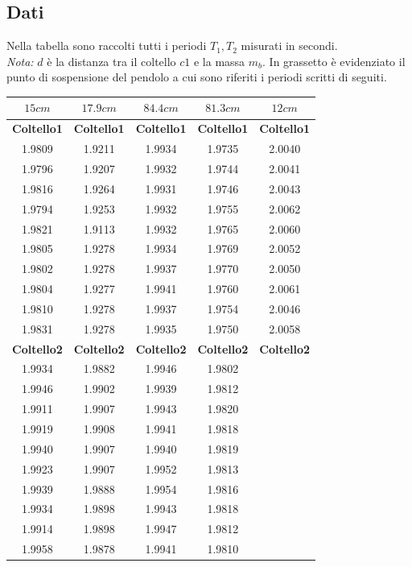 \subsection{Dati}
Nella tabella sono raccolti tutti i periodi $T_1,T_2$ misurati in secondi. \\
\textit{Nota:} $d$ è la distanza tra il coltello $c1$ e la massa $m_b$. 
In grassetto è evidenziato il punto di sospensione del pendolo a cui sono riferiti i periodi scritti di seguiti. 
\begin{center}
\begin{tabular}{*{5}{c}}

\textbf{$15cm$} & \textbf{$17.9cm$} & \textbf{$84.4cm$}& \textbf{$81.3cm$}& \textbf{$12cm$}\\
\midrule
 \textbf{Coltello1}&\textbf{Coltello1}&\textbf{Coltello1}&\textbf{Coltello1}&\textbf{Coltello1}\\
 1.9809 & 1.9211 & 1.9934 & 1.9735 & 2.0040\\
 1.9796 & 1.9207 & 1.9932 & 1.9744 & 2.0041\\
 1.9816 & 1.9264 & 1.9931 & 1.9746 & 2.0043\\
 1.9794 & 1.9253 & 1.9932 & 1.9755 & 2.0062\\
 1.9821 & 1.9113 & 1.9932 & 1.9765 & 2.0060\\
 1.9805 & 1.9278 & 1.9934 & 1.9769 & 2.0052\\
 1.9802 & 1.9278 & 1.9937 & 1.9770 & 2.0050\\
 1.9804 & 1.9277 & 1.9941 & 1.9760 & 2.0061\\
 1.9810 & 1.9278 & 1.9937 & 1.9754 & 2.0046\\
 1.9831 & 1.9278 & 1.9935 & 1.9750 & 2.0058\\

 \textbf{Coltello2}&\textbf{Coltello2}&\textbf{Coltello2}&\textbf{Coltello2}&\textbf{Coltello2}\\
 1.9934 & 1.9882 & 1.9946 &	1.9802 & \\
 1.9946 & 1.9902 & 1.9939 &	1.9812 & \\
 1.9911 & 1.9907 & 1.9943 &	1.9820 & \\
 1.9919 & 1.9908 & 1.9941 &	1.9818 & \\
 1.9940 & 1.9907 & 1.9940 &	1.9819 & \\
 1.9923 & 1.9907 & 1.9952 &	1.9813 & \\
 1.9939 & 1.9888 & 1.9954 &	1.9816 & \\
 1.9934 & 1.9898 & 1.9943 &	1.9818 & \\
 1.9914 & 1.9898 & 1.9947 &	1.9812 & \\
 1.9958 & 1.9878 & 1.9941 &	1.9810 & \\
\bottomrule
\end{tabular}
\end{center}
